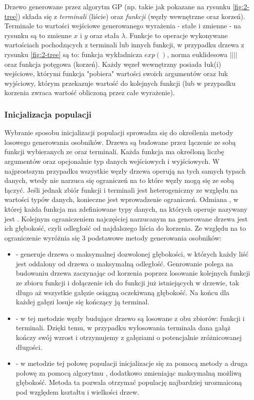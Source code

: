 Drzewo generowane przez algorytm GP (np. takie jak pokazane na rysunku \ref{fig:2-tree})  składa się z \emph{terminali} (liście) oraz \emph{funkcji} (węzły wewnętrzne oraz korzeń). Terminale to wartości wejściowe generowanego wyrażenia - stałe i zmienne - na rysunku są to zmienne $ x $ i $ y $ oraz stała $ \lambda $. Funkcje to operacje wykonywane wartościach pochodzących z terminali lub innych funkcji, w przypadku drzewa z rysunku \ref{fig:2-tree} są to: funkcja wykładnicza $ exp() $, norma euklidesowa $ || || $ oraz funkcja potęgowa (korzeń). Każdy węzeł wewnętrzny posiada łuk(i) wejściowe, którymi funkcja "pobiera" wartości swoich argumentów oraz łuk wyjściowy, którym przekazuje wartość do kolejnych funkcji (lub w przypadku korzenia zwraca wartość obliczoną przez całe wyrażenie).

\subsubsection{Inicjalizacja populacji}
\label{ssec:inicjalizacja}
Wybranie sposobu inicjalizacji populacji sprowadza się do określenia metody losowego generowania osobników. Drzewa są budowane przez łączenie ze sobą funkcji wybieranych ze  oraz terminali. Każda funkcja ma określoną liczbę argumentów oraz opcjonalnie typ danych wejściowych i wyjściowych. W najprostszym przypadku wszystkie węzły drzewa operują na tych samych typach danych, wtedy nie narzuca się ograniczeń na to które węzły mogą się ze sobą łączyć. Jeśli jednak zbiór funkcji i terminali jest heterogeniczny ze względu na wartości typów danych, konieczne jest wprowadzenie ograniczeń. Odmiana , w której każda funkcja ma zdefiniowane typy danych, na których operuje nazywany jest .
Kolejnym ograniczeniem najczęściej narzucanym na generowane drzewa jest ich głębokość, czyli odległość od najdalszego liścia do korzenia. Ze względu na to ograniczenie wyróżnia się 3 podstawowe metody generowania osobników:
\begin{itemize}
	\item {} - generuje drzewa o maksymalnej dozwolonej głębokości, w których każdy liść jest oddalony od drzewa o maksymalną odległość. Genrowanie polega na budowaniu drzewa zaczynając od korzenia poprzez losowanie kolejnych funkcji ze zbioru funkcji i dołączenie ich do funkcji już istniejących w drzewie, tak długo aż wszystkie gałęzie osiągną oczekiwaną głębokość. Na końcu dla każdej gałęzi losuje się kończący ją terminal.
	\item {} - w tej metodzie węzły budujące drzewo są losowane z obu zbiorów: funkcji i terminali. Dzięki temu, w przypadku wylosowania terminala dana gałąż kończy swój wzrost i otrzymujemy z gałęziami o potencjalnie zróżnicowanej długości.
	\item {} - w metodzie tej połowę populacji inicjalizacje się za pomocą metody  a druga połowę za pomocą algorytmu , dodatkowo zmieniając maksymalną możliwą głębokość. Metoda ta pozwala otrzymać populację najbardziej urozmaiconą pod względem kształtu i wielkości drzew.
\end{itemize}


